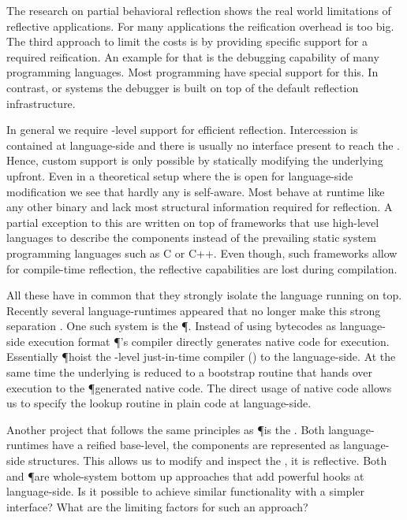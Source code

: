 The research on partial behavioral reflection shows the real world limitations of reflective applications.
For many applications the reification overhead is too big.
The third approach to limit the costs is by providing specific support for a required reification.
An example for that is the debugging capability of many programming languages.
Most programming have special \VM support for this.
In contrast, \PH or \ST systems the debugger is built on top of the default reflection infrastructure.

In general we require \VM-level support for efficient reflection.
Intercession is contained at language-side and there is usually no interface present to reach the \VM.
Hence, custom support is only possible by statically modifying the underlying \VM upfront.
Even in a theoretical setup where the \VM is open for language-side modification we see that hardly any \VM is self-aware.
Most \VMs behave at runtime like any other binary and lack most structural information required for reflection.
A partial exception to this are \VMs written on top of \VM frameworks that use high-level languages to describe the \VM components instead of the prevailing static system programming languages such as C or C++.
Even though, such \VM frameworks allow for compile-time reflection, the reflective capabilities are lost during compilation.

All these \VMs have in common that they strongly isolate the language running on top.
Recently several language-runtimes appeared that no longer make this strong separation \cite{Unga05a, Verw12a}.
One such system is the \P \ST \VM.
Instead of using bytecodes as language-side execution format \P's compiler directly generates native code for execution.
Essentially \P hoist the \VM-level just-in-time compiler (\JIT) to the language-side.
At the same time the underlying \VM is reduced to a bootstrap routine that hands over execution to the \P generated native code.
The direct usage of native code allows us to specify the lookup routine in plain \ST code at language-side.

Another project that follows the same principles as \P is the \Klein \VM.
Both language-runtimes have a reified base-level, the \VM components are represented as language-side structures.
This allows us to modify and inspect the \VM, it is reflective.
Both \Klein and \P are whole-system bottom up approaches that add powerful hooks at language-side.
Is it possible to achieve similar functionality with a simpler interface?
What are the limiting factors for such an approach?

